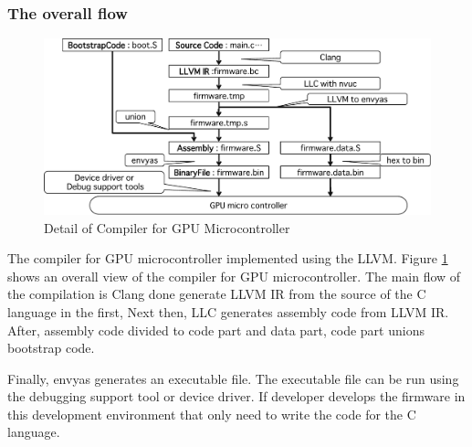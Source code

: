\subsubsection{The overall flow}\label{section:flow}
\begin{figure}
\begin{center}
\includegraphics[width=12cm]{./img/step_compiler.pdf}
\end{center}
\caption{Detail of Compiler for GPU Microcontroller}
\label{fig:compiler}
\end{figure}


The compiler for GPU microcontroller implemented using the LLVM.
Figure \ref{fig:compiler} shows an overall view of the compiler for GPU microcontroller.
The main flow of the compilation is Clang done generate LLVM IR from the source of the C language in the first,
Next then, LLC generates assembly code from LLVM IR.
After, assembly code divided to code part and data part, code part unions bootstrap code.

Finally, envyas generates an executable file.
The executable file can be run using the debugging support tool or device driver.
If developer develops the firmware in this development environment that only need to write the code for the C language.

